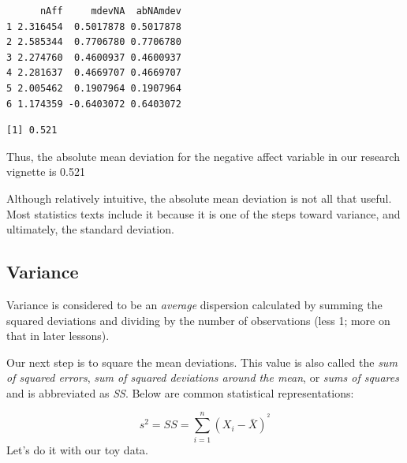 \documentclass[
  11pt,
]{book}
\newenvironment{Shaded}{\begin{snugshade}}{\end{snugshade}}
\newcommand{\AttributeTok}[1]{\textcolor[rgb]{0.77,0.63,0.00}{#1}}
\newcommand{\CommentTok}[1]{\textcolor[rgb]{0.56,0.35,0.01}{\textit{#1}}}
\newcommand{\ConstantTok}[1]{\textcolor[rgb]{0.00,0.00,0.00}{#1}}
\newcommand{\DecValTok}[1]{\textcolor[rgb]{0.00,0.00,0.81}{#1}}
\newcommand{\FunctionTok}[1]{\textcolor[rgb]{0.00,0.00,0.00}{#1}}
\newcommand{\NormalTok}[1]{#1}
\newcommand{\OtherTok}[1]{\textcolor[rgb]{0.56,0.35,0.01}{#1}}
\newcommand{\SpecialCharTok}[1]{\textcolor[rgb]{0.00,0.00,0.00}{#1}}
\begin{document}
\begin{verbatim}
      nAff     mdevNA  abNAmdev
1 2.316454  0.5017878 0.5017878
2 2.585344  0.7706780 0.7706780
3 2.274760  0.4600937 0.4600937
4 2.281637  0.4669707 0.4669707
5 2.005462  0.1907964 0.1907964
6 1.174359 -0.6403072 0.6403072
\end{verbatim}

\begin{Shaded}
\end{Shaded}

\begin{verbatim}
[1] 0.521
\end{verbatim}

Thus, the absolute mean deviation for the negative affect variable in our research vignette is 0.521

Although relatively intuitive, the absolute mean deviation is not all that useful. Most statistics texts include it because it is one of the steps toward variance, and ultimately, the standard deviation.

\hypertarget{variance}{%
\subsection{Variance}\label{variance}}

Variance is considered to be an \emph{average} dispersion calculated by summing the squared deviations and dividing by the number of observations (less 1; more on that in later lessons).

Our next step is to square the mean deviations. This value is also called the \emph{sum of squared errors}, \emph{sum of squared deviations around the mean}, or \emph{sums of squares} and is abbreviated as \emph{SS}. Below are common statistical representations:

\[s^{2}=SS = \sum_{i=1}^{n}(X_{i} - \bar{X})^{^{2}}\]
Let's do it with our toy data.

\begin{Shaded}
\end{Shaded}
\end{document}
